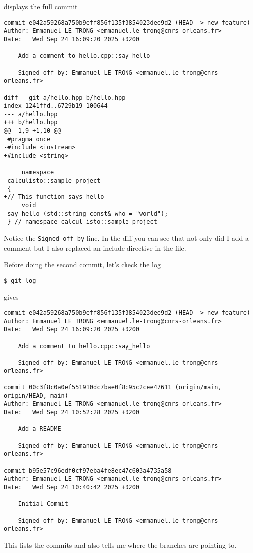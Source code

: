 \documentclass[a4paper]{article}
\begin{document}
displays the full commit
\begin{verbatim}
commit e042a59268a750b9eff856f135f3854023dee9d2 (HEAD -> new_feature)
Author: Emmanuel LE TRONG <emmanuel.le-trong@cnrs-orleans.fr>
Date:   Wed Sep 24 16:09:20 2025 +0200

    Add a comment to hello.cpp::say_hello

    Signed-off-by: Emmanuel LE TRONG <emmanuel.le-trong@cnrs-orleans.fr>

diff --git a/hello.hpp b/hello.hpp
index 1241ffd..6729b19 100644
--- a/hello.hpp
+++ b/hello.hpp
@@ -1,9 +1,10 @@
 #pragma once
-#include <iostream>
+#include <string>

     namespace
 calculisto::sample_project
 {
+// This function says hello
     void
 say_hello (std::string const& who = "world");
 } // namespace calcul_isto::sample_project
\end{verbatim}
Notice the \texttt{Signed-off-by} line. In the diff you can see that not only
did I add a comment but I also replaced an include directive in the file.

Before doing the second commit, let's check the log
\begin{verbatim}
$ git log
\end{verbatim}
gives
\begin{verbatim}
commit e042a59268a750b9eff856f135f3854023dee9d2 (HEAD -> new_feature)
Author: Emmanuel LE TRONG <emmanuel.le-trong@cnrs-orleans.fr>
Date:   Wed Sep 24 16:09:20 2025 +0200

    Add a comment to hello.cpp::say_hello

    Signed-off-by: Emmanuel LE TRONG <emmanuel.le-trong@cnrs-orleans.fr>

commit 00c3f8c0a0ef551910dc7bae0f8c95c2cee47611 (origin/main, origin/HEAD, main)
Author: Emmanuel LE TRONG <emmanuel.le-trong@cnrs-orleans.fr>
Date:   Wed Sep 24 10:52:28 2025 +0200

    Add a README

    Signed-off-by: Emmanuel LE TRONG <emmanuel.le-trong@cnrs-orleans.fr>

commit b95e57c96edf0cf97eba4fe8ec47c603a4735a58
Author: Emmanuel LE TRONG <emmanuel.le-trong@cnrs-orleans.fr>
Date:   Wed Sep 24 10:40:42 2025 +0200

    Initial Commit

    Signed-off-by: Emmanuel LE TRONG <emmanuel.le-trong@cnrs-orleans.fr>
\end{verbatim}
This lists the commits and also tells me where the branches are pointing to. 
\end{document}
